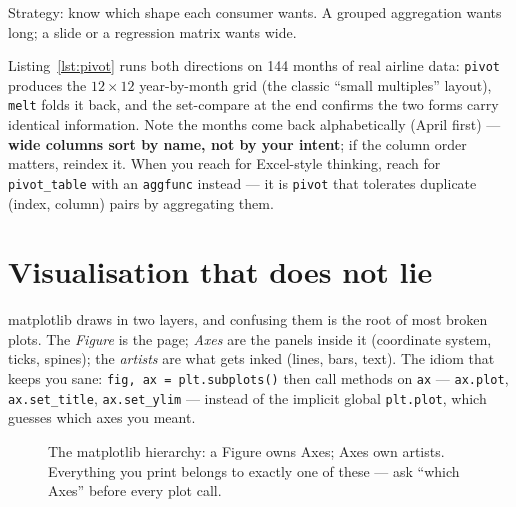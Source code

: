 

\begin{example}\label{ex:pivot}
Strategy: know which shape each consumer wants. A grouped aggregation wants
long; a slide or a regression matrix wants wide.\par
\begin{solution}
Listing~\ref{lst:pivot} runs both directions on 144 months of real airline
data: \texttt{pivot} produces the $12\times12$ year-by-month grid (the
classic ``small multiples'' layout), \texttt{melt} folds it back, and the
set-compare at the end confirms the two forms carry identical information.
Note the months come back alphabetically (April first) --- \textbf{wide
columns sort by name, not by your intent}; if the column order matters,
reindex it. When you reach for Excel-style thinking, reach for
\texttt{pivot\_table} with an \texttt{aggfunc} instead --- it is
\texttt{pivot} that tolerates duplicate (index, column) pairs by
aggregating them.
\end{solution}
\end{example}

\section{Visualisation that does not lie}\label{sec:viz}

matplotlib draws in two layers, and confusing them is the
root of most broken plots. The \emph{Figure} is the page; \emph{Axes} are the
panels inside it (coordinate system, ticks, spines); the \emph{artists} are
what gets inked (lines, bars, text). The idiom that keeps you sane:
\texttt{fig, ax = plt.subplots()} then call methods on \texttt{ax} ---
\texttt{ax.plot}, \texttt{ax.set\_title}, \texttt{ax.set\_ylim} --- instead
of the implicit global \texttt{plt.plot}, which guesses which axes you
meant.

\begin{figure}[ht]\centering
{}
\caption{The matplotlib hierarchy: a Figure owns Axes; Axes own artists.
Everything you print belongs to exactly one of these --- ask ``which Axes''
before every plot call.}\label{fig:anatomy}
\end{figure}

